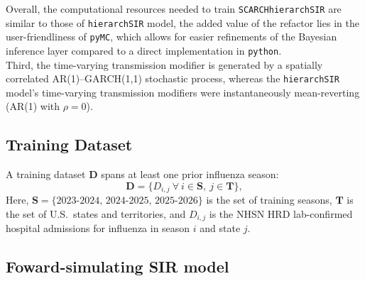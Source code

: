 \documentclass[11pt]{article}
\begin{document}
Overall, the computational resources needed to train \texttt{SCARCHhierarchSIR} are similar to those of \texttt{hierarchSIR} model, the added value of the refactor lies in the user-friendliness of \texttt{pyMC}, which allows for easier refinements of the Bayesian inference layer compared to a direct implementation in \texttt{python}.\\

Third, the time-varying transmission modifier is generated by a spatially correlated AR(1)--GARCH(1,1) stochastic process, whereas the \texttt{hierarchSIR} model's time-varying transmission modifiers were instantaneously mean-reverting (AR(1) with $\rho = 0$).

\subsection*{Training Dataset}

A training dataset $\bm{D}$ spans at least one prior influenza season:
\begin{equation}
    \bm{D} = \bigl\{ D_{i,j}\ \forall\ i \in \bm{S},\ j \in \bm{T} \bigr\},
\end{equation}
Here, $\bm{S} = \{2023\text{-}2024,\, 2024\text{-}2025,\, 2025\text{-}2026\}$ is the set of training seasons, $\bm{T}$ is the set of U.S.\ states and territories, and $D_{i,j}$ is the NHSN HRD lab-confirmed hospital admissions for influenza in season $i$ and state $j$.


\subsection*{Foward-simulating SIR model}

\end{document}
